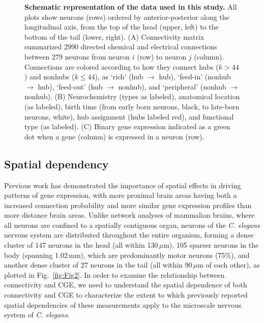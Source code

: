 \documentclass[10pt,letterpaper]{article}
\begin{document}
\begin{figure}[h]
  \centering
 \caption{\textbf{Schematic representation of the data used in this study.}
All plots show neurons (rows) ordered by anterior-posterior along the longitudinal axis, from the top of the head (upper, left) to the bottom of the tail (lower, right).
(A) Connectivity matrix summarized 2990 directed chemical and electrical connections between 279 neurons from neuron $i$ (row) to neuron $j$ (column).
Connections are colored according to how they connect hubs ($k > 44$) and nonhubs ($k \leq 44$), as `rich' (hub $\rightarrow$ hub), `feed-in' (nonhub $\rightarrow$ hub), `feed-out' (hub $\rightarrow$ nonhub), and `peripheral' (nonhub $\rightarrow$ nonhub).
(B) Neurochemistry (types as labeled), anatomical location (as labeled), birth time (from early born neurons, black, to late-born neurons, white), hub assignment (hubs labeled red), and functional type (as labeled).
(C) Binary gene expression indicated as a green dot when a gene (column) is expressed in a neuron (row).}
\label{fig:Fig1}
\end{figure}

\subsection*{Spatial dependency}
Previous work has demonstrated the importance of spatial effects in driving patterns of gene expression, with more proximal brain areas \cite{Horvat:2016ia, Wang:2016gg, Markov:2013jo, Henderson:2014fg, Fulcher:2016ck, Noori:2017ce, Levy:2012dy, Azulay:2016cg} having both a increased connection probability and more similar gene expression profiles \cite{Krienen:2016eq, Fulcher:2016ck, Pantazatos:2016ir, Richiardi:2017hb} than more distance brain areas.
Unlike network analyses of mammalian brains, where all neurons are confined to a spatially contiguous organ, neurons of the \emph{C. elegans} nervous system are distributed throughout the entire organism, forming a dense cluster of 147 neurons in the head (all within 130\,$\mu$m), 105 sparser neurons in the body (spanning 1.02\,mm), which are predominantly motor neurons (75\%), and another dense cluster of 27 neurons in the tail (all within 90\,$\mu$m of each other), as plotted in Fig.~\ref{fig:Fig2}.
In order to examine the relationship between connectivity and CGE, we need to understand the spatial dependence of both connectivity and CGE to characterize the extent to which previously reported spatial dependencies of these measurements apply to the microscale nervous system of \emph{C. elegans}.
\end{document}
